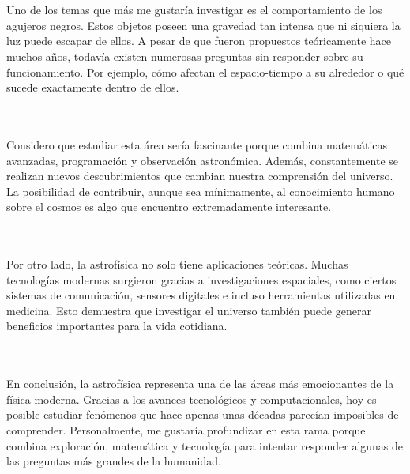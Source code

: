 \documentclass[12pt]{article}
\begin{document}
\\ \\

Uno de los temas que más me gustaría investigar es el comportamiento de los agujeros negros. Estos objetos poseen una gravedad tan intensa que ni siquiera la luz puede escapar de ellos. A pesar de que fueron propuestos teóricamente hace muchos años, todavía existen numerosas preguntas sin responder sobre su funcionamiento. Por ejemplo, cómo afectan el espacio-tiempo a su alrededor o qué sucede exactamente dentro de ellos.

\\ \\

Considero que estudiar esta área sería fascinante porque combina matemáticas avanzadas, programación y observación astronómica. Además, constantemente se realizan nuevos descubrimientos que cambian nuestra comprensión del universo. La posibilidad de contribuir, aunque sea mínimamente, al conocimiento humano sobre el cosmos es algo que encuentro extremadamente interesante.

\\ \\

Por otro lado, la astrofísica no solo tiene aplicaciones teóricas. Muchas tecnologías modernas surgieron gracias a investigaciones espaciales, como ciertos sistemas de comunicación, sensores digitales e incluso herramientas utilizadas en medicina. Esto demuestra que investigar el universo también puede generar beneficios importantes para la vida cotidiana.

\\ \\

En conclusión, la astrofísica representa una de las áreas más emocionantes de la física moderna. Gracias a los avances tecnológicos y computacionales, hoy es posible estudiar fenómenos que hace apenas unas décadas parecían imposibles de comprender. Personalmente, me gustaría profundizar en esta rama porque combina exploración, matemática y tecnología para intentar responder algunas de las preguntas más grandes de la humanidad.
\end{document}

